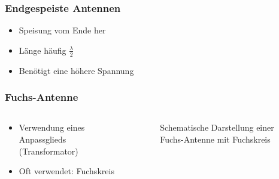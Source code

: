 \begin{frame}
\frametitle{Endgespeiste Antennen}
\begin{itemize}
  \item Speisung vom Ende her
  \item Länge häufig $\frac{\lambda}{2}$
  \item Benötigt eine höhere Spannung
  \end{itemize}
\end{frame}

\begin{frame}
\frametitle{Fuchs-Antenne}
\begin{columns}
    \begin{column}{0.48\textwidth}
    \begin{itemize}
  \item Verwendung eines Anpassglieds (Transformator)
  \item Oft verwendet: Fuchskreis
  \end{itemize}

    \end{column}
   \begin{column}{0.48\textwidth}
       
\begin{figure}
    \caption{\scriptsize Schematische Darstellung einer Fuchs-Antenne mit Fuchskreis}
    \label{e_antennenformen_fuchskreis}
\end{figure}


   \end{column}
\end{columns}

\end{frame}

\begin{frame}
\end{frame}

